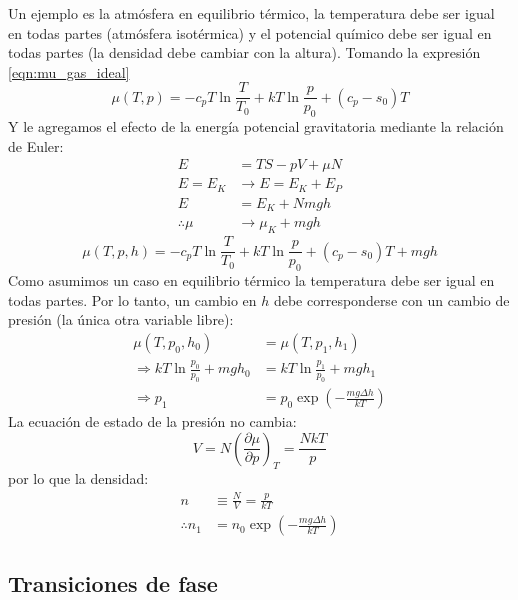 \documentclass[]{article}
\numberwithin{equation}{section}
\newcommand{\deriv}[3]{\left(\frac{\partial #1}{\partial #2} \right)_{#3}}
\newcommand{\0}{\textcolor{gray}{0}}
\begin{document}
Un ejemplo es la atmósfera en equilibrio térmico, la temperatura debe ser igual en todas partes (atmósfera isotérmica) y el potencial químico debe ser igual en todas partes (la densidad debe cambiar con la altura). Tomando la expresión \ref{eqn:mu_gas_ideal}
\begin{equation*}
	\mu (T,p) = -c_pT\ln\frac{T}{T_0} + kT\ln\frac{p}{p_0} + (c_p-s_0)T
\end{equation*}
Y le agregamos el efecto de la energía potencial gravitatoria mediante la relación de Euler:
\begin{align*}
	E &= TS - pV + \mu N\\
	E = E_K &\rightarrow E = E_K + E_P\\
	E &= E_K + Nmgh\\
	\therefore \mu &\rightarrow \mu_K + mgh
\end{align*}
\begin{equation}
	\mu (T,p,h) = -c_pT\ln\frac{T}{T_0} + kT\ln\frac{p}{p_0} + (c_p-s_0)T + mgh
\end{equation}
Como asumimos un caso en equilibrio térmico la temperatura debe ser igual en todas partes. Por lo tanto, un cambio en \(h\) debe corresponderse con un cambio de presión (la única otra variable libre):
\begin{align}
	\mu(T,p_0,h_0) &= \mu(T,p_1,h_1)\nonumber\\
	\Rightarrow  kT\ln\frac{p_0}{p_0} + mgh_0 &= kT\ln\frac{p_1}{p_0} + mgh_1\nonumber\\
	\Rightarrow p_1 &= p_0 \exp\left(-\frac{mg\Delta h}{kT}\right) 
\end{align}
La ecuación de estado de la presión no cambia:
\begin{equation*}
	V = N\deriv{\mu}{p}{T} = \frac{NkT}{p}
\end{equation*}
por lo que la densidad:
\begin{align}
	n &\equiv \frac{N}{V} = \frac{p}{kT}\\
	\therefore n_1 &= n_0 \exp\left(-\frac{mg\Delta h}{kT}\right) 
\end{align}

\subsection{Transiciones de fase}
\end{document}

